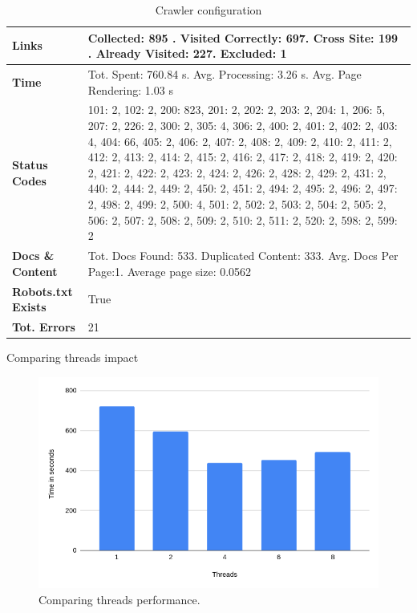 {\begin{table}[ht] 
{\footnotesize
\begin{tabular}{ P{3cm} ||P{10.1cm}  }      %
 \hline \hline
\textbf{Links} & Collected: 895 . Visited Correctly: 697. Cross Site: 199 . Already Visited: 227. Excluded: 1\T\B 
\\ 
\hline
\textbf{Time} & Tot. Spent: 760.84 s. Avg. Processing: 3.26 s. Avg. Page Rendering: 1.03 s\T\B 
\\
\hline
\textbf{Status Codes} &     101: 2, 102: 2, 200: 823, 201: 2, 202: 2, 203: 2, 204: 1, 206: 5, 207: 2, 226: 2, 300: 2, 305: 4, 306: 2, 400: 2, 401: 2, 402: 2, 403: 4, 404: 66, 405: 2, 406: 2, 407: 2, 408: 2, 409: 2, 410: 2, 411: 2, 412: 2, 413: 2, 414: 2, 415: 2, 416: 2, 417: 2, 418: 2, 419: 2, 420: 2, 421: 2, 422: 2, 423: 2, 424: 2, 426: 2, 428: 2, 429: 2, 431: 2, 440: 2, 444: 2, 449: 2, 450: 2, 451: 2, 494: 2, 495: 2, 496: 2, 497: 2, 498: 2, 499: 2, 500: 4, 501: 2, 502: 2, 503: 2, 504: 2, 505: 2, 506: 2, 507: 2, 508: 2, 509: 2, 510: 2, 511: 2, 520: 2, 598: 2, 599: 2\T\B 
\\ 
\hline
\textbf{Docs \& Content} & Tot. Docs Found: 533. Duplicated Content: 333. Avg. Docs Per Page:1. Average page size: 0.0562\T\B 
\\ 
\hline
\textbf{Robots.txt Exists} & True\T\B 
\\ 
\hline
\textbf{Tot. Errors} & 21\T\B 
\\ 
\hline \hline
    \end{tabular}
}
  \captionsetup{justification=centering,margin=2cm}
  \caption{Crawler configuration}
\end{table}


Comparing threads impact

\begin{figure}[h]	
     \centering
     \includegraphics[width=13cm]{images/threads-table.png}
     \caption{Comparing threads performance.}
     \label{fig:google-arch}
\end{figure}

}
